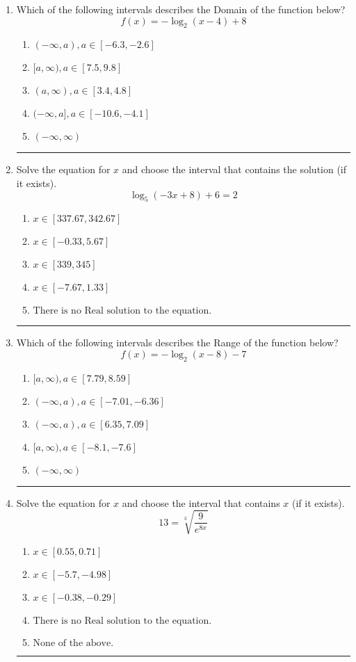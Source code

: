 \documentclass[14pt]{extbook}
\newcommand{\litem}[1]{\item#1\hspace*{-1cm}\rule{\textwidth}{0.4pt}}
\begin{document}
\begin{enumerate}
\litem{
Which of the following intervals describes the Domain of the function below?\[ f(x) = -\log_2{(x-4)}+8 \]\begin{enumerate}[label=\Alph*.]
\item \( (-\infty, a), a \in [-6.3, -2.6] \)
\item \( [a, \infty), a \in [7.5, 9.8] \)
\item \( (a, \infty), a \in [3.4, 4.8] \)
\item \( (-\infty, a], a \in [-10.6, -4.1] \)
\item \( (-\infty, \infty) \)

\end{enumerate} }
\litem{
Solve the equation for $x$ and choose the interval that contains the solution (if it exists).\[ \log_{5}{(-3x+8)}+6 = 2 \]\begin{enumerate}[label=\Alph*.]
\item \( x \in [337.67, 342.67] \)
\item \( x \in [-0.33, 5.67] \)
\item \( x \in [339, 345] \)
\item \( x \in [-7.67, 1.33] \)
\item \( \text{There is no Real solution to the equation.} \)

\end{enumerate} }
\litem{
Which of the following intervals describes the Range of the function below?\[ f(x) = -\log_2{(x-8)}-7 \]\begin{enumerate}[label=\Alph*.]
\item \( [a, \infty), a \in [7.79, 8.59] \)
\item \( (-\infty, a), a \in [-7.01, -6.36] \)
\item \( (-\infty, a), a \in [6.35, 7.09] \)
\item \( [a, \infty), a \in [-8.1, -7.6] \)
\item \( (-\infty, \infty) \)

\end{enumerate} }
\litem{
 Solve the equation for $x$ and choose the interval that contains $x$ (if it exists).\[  13 = \sqrt[3]{\frac{9}{e^{8x}}} \]\begin{enumerate}[label=\Alph*.]
\item \( x \in [0.55, 0.71] \)
\item \( x \in [-5.7, -4.98] \)
\item \( x \in [-0.38, -0.29] \)
\item \( \text{There is no Real solution to the equation.} \)
\item \( \text{None of the above.} \)


\end{enumerate}}
\end{enumerate}
\end{document}
